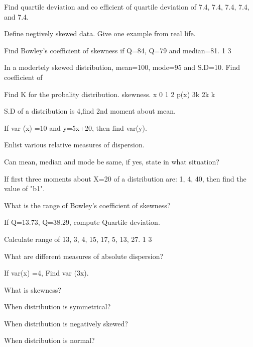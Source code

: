 \documentclass[11pt,a4paper]{article}
\begin{document}
\begin{shortlist}
\item Find quartile deviation and co efficient of quartile deviation of 7.4, 7.4, 7.4, 7.4, and 7.4.

\item Define negtively skewed data. Give one example from real life.

\item Find Bowley's coefficient of skewness if Q=84, Q=79 and median=81. 1 3

\item In a modertely skewed distribution, mean=100, mode=95 and S.D=10. Find coefficient of

\item Find K for the probality distribution. skewness. x 0 1 2 p(x) 3k 2k k

\item S.D of a distribution is 4,find 2nd moment about mean.

\item If var (x) =10 and y=5x+20, then find var(y).

\item Enlist various relative measures of dispersion.

\item Can mean, median and mode be same, if yes, state in what situation?

\item If first three moments about X=20 of a distribution are: 1, 4, 40, then find the value of "b1".

\item What is the range of Bowley's coefficient of skewness?

\item If Q=13.73, Q=38.29, compute Quartile deviation.

\item Calculate range of 13, 3, 4, 15, 17, 5, 13, 27. 1 3

\item What are different measures of absolute dispersion?

\item If var(x) =4, Find var (3x).

\item What is skewness?

\item When distribution is symmetrical?

\item When distribution is negatively skewed?

\item When distribution is normal?


\end{shortlist}
\end{document}
